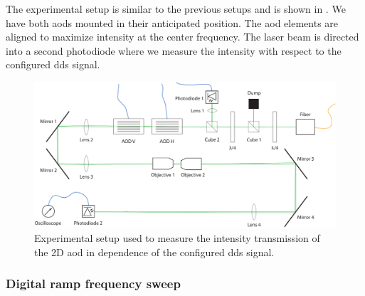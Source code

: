 The experimental setup is similar to the previous setups and is shown in
. We have both \gls{aod}s mounted in
their anticipated position. The \gls{aod} elements are aligned to maximize
intensity at the center frequency. The laser beam is directed into a second
photodiode where we measure the intensity with respect to the configured
\gls{dds} signal.
\begin{figure}[htb]
  \centering
  \includegraphics[width=\textwidth]{../media/setup/intensity-distribution.pdf}
  \caption{Experimental setup used to measure the intensity transmission of
    the 2D \gls{aod} in dependence of the configured \gls{dds} signal.
  }\label{fig:intensity_distribution_setup}
\end{figure}

\subsubsection{Digital ramp frequency sweep}

